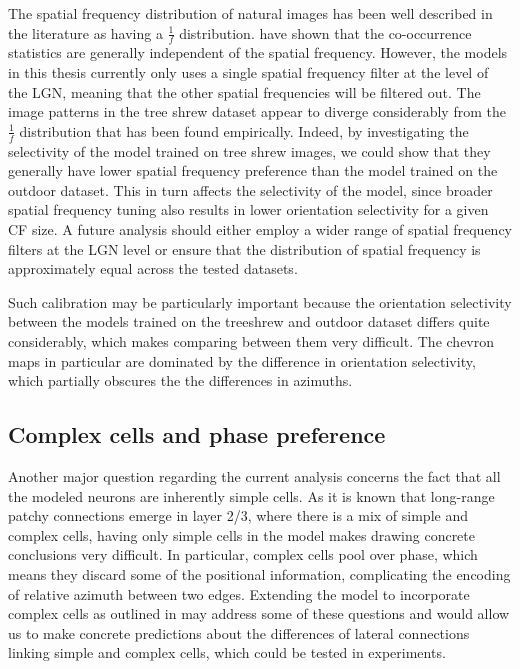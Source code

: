 The spatial frequency distribution of natural images has been well
described in the literature as having a $\frac{1}{f}$
distribution. \cite{Perrinet2015} have shown that the co-occurrence
statistics are generally independent of the spatial
frequency. However, the models in this thesis currently only uses a
single spatial frequency filter at the level of the LGN, meaning that
the other spatial frequencies will be filtered out. The image patterns
in the tree shrew dataset appear to diverge considerably from the
$\frac{1}{f}$ distribution that has been found empirically. Indeed, by
investigating the selectivity of the model trained on tree shrew
images, we could show that they generally have lower spatial frequency
preference than the model trained on the outdoor dataset. This in turn
affects the selectivity of the model, since broader spatial frequency
tuning also results in lower orientation selectivity for a given CF
size. A future analysis should either employ a wider range of spatial
frequency filters at the LGN level or ensure that the distribution of
spatial frequency is approximately equal across the tested datasets.

Such calibration may be particularly important because the orientation
selectivity between the models trained on the treeshrew and outdoor
dataset differs quite considerably, which makes comparing between them
very difficult. The chevron maps in particular are dominated by the
difference in orientation selectivity, which partially obscures the
the differences in azimuths.

\subsection{Complex cells and phase preference}

Another major question regarding the current analysis concerns the
fact that all the modeled neurons are inherently simple cells. As it
is known that long-range patchy connections emerge in layer 2/3, where
there is a mix of simple and complex cells, having only simple cells
in the model makes drawing concrete conclusions very difficult. In
particular, complex cells pool over phase, which means they discard
some of the positional information, complicating the encoding of
relative azimuth between two edges. Extending the model to incorporate
complex cells as outlined in \cite{Antolik2010} may address some of
these questions and would allow us to make concrete predictions about
the differences of lateral connections linking simple and complex
cells, which could be tested in experiments.

